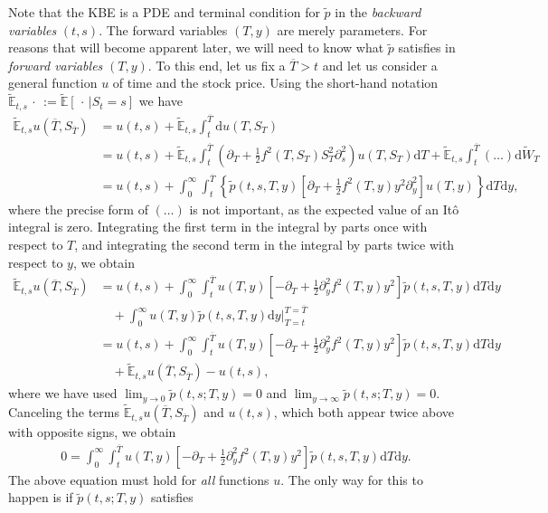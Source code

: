 \documentclass[12pt]{book}
\numberwithin{equation}{chapter}
\theoremstyle{plain}
\numberwithin{theorem}{section}
\theoremstyle{definition}
\numberwithin{exercise}{chapter}
\newcommand{\<}{\langle}
\renewcommand{\>}{\rangle}
\renewcommand{\(}{\left(}
\renewcommand{\)}{\right)}
\renewcommand{\[}{\left[}
\renewcommand{\]}{\right]}
\newcommand\Eb{\mathds{E}}
\newcommand\Ebt{\widetilde{\Eb}}
\newcommand\Wt{\widetilde{W}}
\renewcommand\d{\partial}
\newcommand\dd{\mathrm{d}}
\theoremstyle{definition}
\numberwithin{question}{section}
\newcommand\pt{\widetilde{p}}
\begin{document}
Note that the KBE is a PDE and terminal condition for $\pt$ in the \textit{backward variables} $(t,s)$.  
The forward variables $(T,y)$ are merely parameters.
For reasons that will become apparent later, we will need to know what $\pt$ satisfies in \textit{forward variables} $(T,y)$.  
To this end, let us fix a $\overline{T} > t$ and let us consider a general function $u$ of time and the stock price.  Using the short-hand notation
$\Ebt_{t,s}\, \cdot \, := \Ebt[ \, \cdot \, | S_t = s ]$ we have
\begin{align}
\Ebt_{t,s} u(\overline{T},S_{\overline{T}}) 
	&= u(t,s) + \Ebt_{t,s} \int_t^{\overline{T}} \dd u(T,S_{T}) \\
	&= u(t,s) + \Ebt_{t,s} \int_t^{\overline{T}} \(\d_{T} + \frac{1}{2}f^2(T,S_{T})S^2_{T}  \d_{s}^2\) u(T,S_{T}) \dd T  
		 + \Ebt_{t,s} \int_t^{\overline{T}} (\ldots) \dd \Wt_T \\
	&= u(t,s) + \int_0^\infty \int_t^{\overline{T}} \left\{ \pt(t,s,T,y)\[ \d_{T} + \frac{1}{2} f^2(T,y) y^2 \d_y^2 \] u(T,y) \right\} \dd T \dd y ,
\end{align}
where the precise form of $( \ldots )$ is not important, as the expected value of an It\^o integral is zero.
Integrating the first term in the integral by parts once with respect to $T$, and integrating the second term in the integral by parts twice with respect to $y$, we obtain
\begin{align}
\Ebt_{t,s} u(\overline{T},S_{\overline{T}}) 
	&= u(t,s) + \int_0^\infty \int_t^{\overline{T}} u(T,y) \[ -\d_{T} + \frac{1}{2} \d^2_y f^2 (T,y) y^2  \] \pt (t,s,T,y) \dd T \dd y \\ & \quad
		+ \int_0^\infty u(T,y) \pt (t,s,T,y) \dd y \Big|_{T=t}^{T=\overline{T}} \\
	&= u(t,s) + \int_0^\infty \int_t^{\overline{T}} u(T,y) \[ -\d_{T} + \frac{1}{2} \d^2_y f^2 (T,y) y^2 \] \pt (t,s,T,y) \dd T \dd y \\ & \quad
		+ \Ebt_{t,s} u(\overline{T},S_{\overline{T}})  - u(t,s) ,
\end{align}
where we have used $\lim_{y \to 0} \pt(t,s;T,y) = 0$ and $\lim_{y \to \infty} \pt(t,s;T,y) = 0$.
Canceling the terms $\Ebt_{t,s} u(\overline{T},S_{\overline{T}}) $ and $u(t,s)$, which both appear twice above with opposite signs, we obtain
\begin{align}
0 = \int_0^\infty \int_t^{\overline{T}} u(T,y) \[ -\d_{T} + \frac{1}{2} \d^2_y f^2 (T,y) y^2 \] \pt (t,s,T,y) \dd T \dd y .
\end{align}
The above equation must hold for \textit{all} functions $u$.  The only way for this to happen is if $\pt(t,s;T,y)$ satisfies
\end{document}
